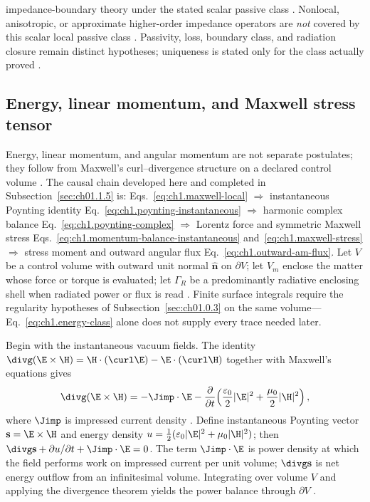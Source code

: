 impedance-boundary theory under the stated scalar passive class \cite{colton1981impedance,sommerfeld1949,stratton1941}. Nonlocal, anisotropic, or approximate higher-order impedance operators are \emph{not} covered by this scalar local passive class \cite{stratton1941}. Passivity, loss, boundary class, and radiation closure remain distinct hypotheses; uniqueness is stated only for the class actually proved \cite{stratton1941}.
\label{prop:ch1.uniqueness-passive-closure}
\label{eq:ch1.uniqueness-condition-index}

\subsection{Energy, linear momentum, and Maxwell stress tensor}
\label{sec:ch01.1.4}

Energy, linear momentum, and angular momentum are not separate postulates; they follow from Maxwell's curl--divergence structure on a declared control volume \cite{poynting1884,maxwell1873}. The causal chain developed here and completed in Subsection~\ref{sec:ch01.1.5} is: Eqs.~\eqref{eq:ch1.maxwell-local} $\Rightarrow$ instantaneous Poynting identity Eq.~\eqref{eq:ch1.poynting-instantaneous} $\Rightarrow$ harmonic complex balance Eq.~\eqref{eq:ch1.poynting-complex} $\Rightarrow$ Lorentz force and symmetric Maxwell stress Eqs.~\eqref{eq:ch1.momentum-balance-instantaneous} and~\eqref{eq:ch1.maxwell-stress} $\Rightarrow$ stress moment and outward angular flux Eq.~\eqref{eq:ch1.outward-am-flux}. Let $V$ be a control volume with outward unit normal $\hat{\mathbf{n}}$ on $\partial V$; let $V_m$ enclose the matter whose force or torque is evaluated; let $\Gamma_R$ be a predominantly radiative enclosing shell when radiated power or flux is read \cite{stratton1941}. Finite surface integrals require the regularity hypotheses of Subsection~\ref{sec:ch01.0.3} on the same volume---Eq.~\eqref{eq:ch1.energy-class} alone does not supply every trace needed later.

Begin with the instantaneous vacuum fields. The identity
$\divg(\E\times\H)=\H\cdot(\curl\E)-\E\cdot(\curl\H)$ together with Maxwell's equations
gives
\begin{equation}
\label{eq:ch1.poynting-instantaneous}
\divg(\E\times\H)
=-\Jimp\cdot\E
-\frac{\partial}{\partial t}\!\left(\frac{\varepsilon_0}{2}|\E|^2+\frac{\mu_0}{2}|\H|^2\right),
\end{equation}
where $\Jimp$ is impressed current density \cite{stratton1941}. Define instantaneous
Poynting vector $\mathbf{s}=\E\times\H$ and energy density
$u=\tfrac12(\varepsilon_0|\E|^2+\mu_0|\H|^2)$; then
$\divg\mathbf{s}+\partial u/\partial t+\Jimp\cdot\E=0$. The term $\Jimp\cdot\E$ is
power density at which the field performs work on impressed current per unit volume; $\divg\mathbf{s}$ is net energy
outflow from an infinitesimal volume. Integrating over volume $V$ and applying the
divergence theorem yields the power balance through $\partial V$ \cite{poynting1884}.

